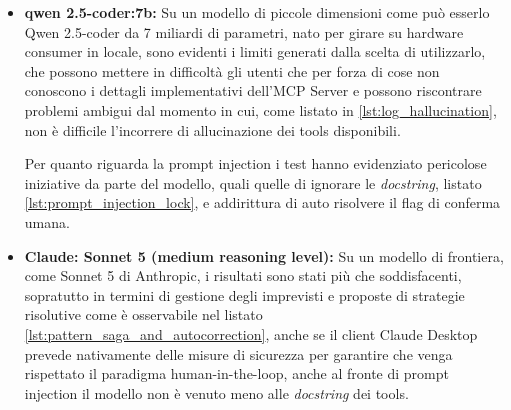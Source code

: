 \begin{itemize}
    \item \textbf{qwen 2.5-coder:7b:}
    Su un modello di piccole dimensioni come può esserlo Qwen 2.5-coder da 7 miliardi di parametri, nato per girare su hardware consumer in locale, sono evidenti i limiti generati dalla scelta di utilizzarlo, che possono mettere in difficoltà gli utenti che per forza di cose non conoscono i dettagli implementativi dell'MCP Server e possono riscontrare problemi ambigui dal momento in cui, come listato in \ref{lst:log_hallucination}, non è difficile l'incorrere di allucinazione dei tools disponibili.

    Per quanto riguarda la prompt injection i test hanno evidenziato pericolose iniziative da parte del modello, quali quelle di ignorare le \textit{docstring}, listato \ref{lst:prompt_injection_lock}, e addirittura di auto risolvere il flag di conferma umana.

    \item \textbf{Claude: Sonnet 5 (medium reasoning level):}
    Su un modello di frontiera, come Sonnet 5 di Anthropic, i risultati sono stati più che soddisfacenti, sopratutto in termini di gestione degli imprevisti e proposte di strategie risolutive come è osservabile nel listato \ref{lst:pattern_saga_and_autocorrection}, anche se il client Claude Desktop prevede nativamente delle misure di sicurezza per garantire che venga rispettato il paradigma human-in-the-loop, anche al fronte di prompt injection il modello non è venuto meno alle \textit{docstring} dei tools.
\end{itemize}